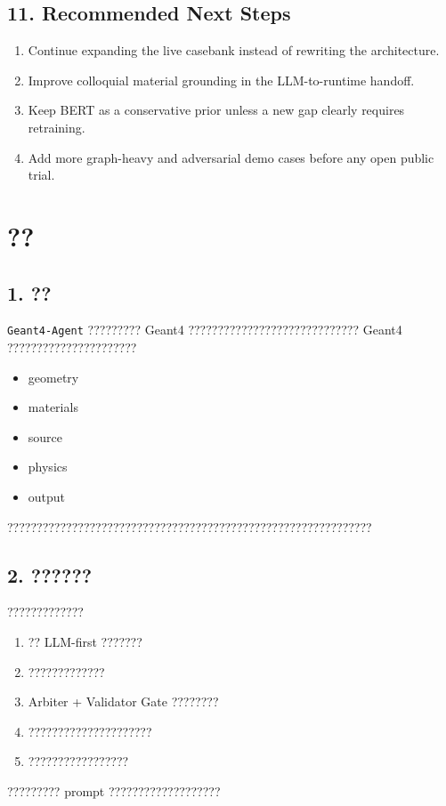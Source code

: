 \documentclass[11pt,a4paper]{ctexart}
\begin{document}
\subsection*{11. Recommended Next Steps}
\begin{enumerate}
\item Continue expanding the live casebank instead of rewriting the architecture.
\item Improve colloquial material grounding in the LLM-to-runtime handoff.
\item Keep BERT as a conservative prior unless a new gap clearly requires retraining.
\item Add more graph-heavy and adversarial demo cases before any open public trial.
\end{enumerate}
\newpage
\section*{??}
\subsection*{1. ??}
\texttt{Geant4-Agent} ????????? Geant4 ????????????????????????????? Geant4 ??????????????????????
\begin{itemize}
\item geometry
\item materials
\item source
\item physics
\item output
\end{itemize}
??????????????????????????????????????????????????????????????
\subsection*{2. ??????}
?????????????
\begin{enumerate}
\item ?? LLM-first ???????
\item ?????????????
\item Arbiter + Validator Gate ????????
\item ?????????????????????
\item ?????????????????
\end{enumerate}
????????? prompt ???????????????????
\end{document}
